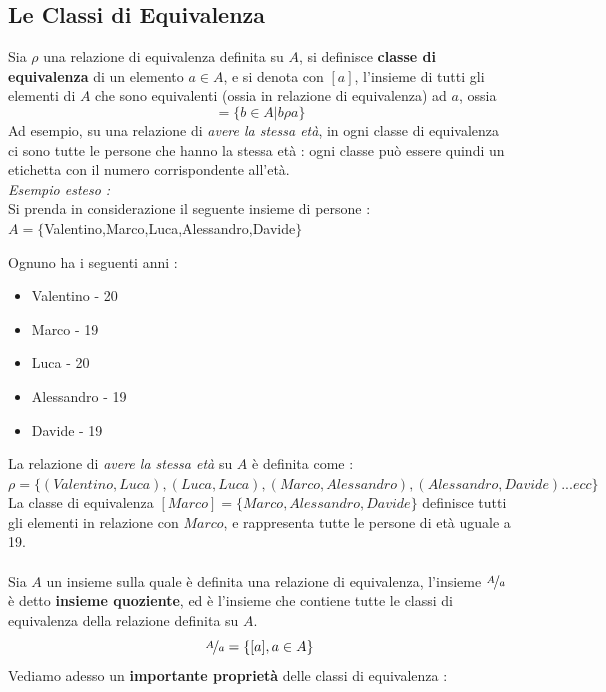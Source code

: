 \documentclass[12pt, letterpaper]{article}
\begin{document}
\subsection{Le Classi di Equivalenza}
Sia \(\rho\) una relazione di equivalenza definita su \(A\), si definisce \textbf{classe di equivalenza} di un 
elemento \(a\in A\), e si denota con \([a]\), l'insieme di tutti gli elementi di \(A\) che sono equivalenti (ossia in relazione di 
equivalenza) ad \(a\), ossia 
\begin{equation}
    [a] = \{b\in A | b\rho a\}
\end{equation}
Ad esempio, su una relazione di \textit{avere la stessa età}, in ogni classe di equivalenza ci sono tutte le persone
che hanno la stessa età : ogni classe può essere quindi un etichetta con il numero corrispondente all'età.
\\ \textit{Esempio esteso : }\\
Si prenda in considerazione il seguente insieme di persone :\\\centering \(A=\{\)Valentino,Marco,Luca,Alessandro,Davide\(\}\)\\
\raggedright
Ognuno ha i seguenti anni : 
\begin{itemize}
    \item Valentino - 20
    \item Marco - 19
    \item Luca - 20
    \item Alessandro - 19
    \item Davide - 19
\end{itemize}
La relazione di \textit{avere la stessa età} su \(A\) è definita come :\\ \(\rho=\{(Valentino,Luca),(Luca,Luca),(Marco,Alessandro),(Alessandro,Davide)...ecc\}\)
\\La classe di equivalenza \([Marco]=\{Marco,Alessandro,Davide\}\) definisce tutti gli elementi in relazione con \(Marco\), e rappresenta
tutte le persone di età uguale a 19.\\\hphantom{.}\\
Sia \(A\) un insieme sulla quale è definita una relazione di equivalenza, l'insieme \(\nicefrac{A}{a}\) è detto 
\textbf{insieme quoziente}, ed è l'insieme che contiene tutte le classi di equivalenza della relazione definita su \(A\).
\begin{equation}
    \nicefrac{A}{a}=\{[a], a\in A\}
\end{equation}
Vediamo adesso un \textbf{importante proprietà} delle classi di equivalenza : 
\newtheorem{theorem}{Teorema}
\end{document}
